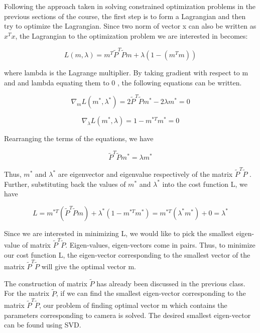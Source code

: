\documentclass[twoside]{article}
\begin{document}
Following the approach taken in solving constrained optimization problems in the previous sections of the course, the first step is to form a Lagrangian and then try to optimize the Lagrangian. Since two norm of vector x can also be written as $x^T x$, the Lagrangian to the optimization problem we are interested in becomes:

\begin{equation} \label{eqno:4}
 L(m,\lambda) = m^T \tilde{P}^T \tilde{P}m + \lambda (1-(m^T m))
\end{equation}

where lambda is the Lagrange multiplier. By taking gradient with respect to m and and lambda equating them to 0 , the following equations can be written.


\begin{equation} \label{eqno:5}
\nabla_m{L(m^*,\lambda^*)} = 2 \tilde{P}^T \tilde{P} m^* - 2 \lambda m^* = 0
\end{equation}

\begin{equation} \label{eqno:6}
\nabla_\lambda{L(m^*,\lambda)} = 1-  m^{*T} m^* = 0
\end{equation}


Rearranging the terms of the equations, we have 

\begin{equation} \label{eqno:7}
\tilde{P}^T \tilde{P} m^* =  \lambda m^*  \end{equation}

Thus, $m^*$ and $\lambda^* $ are eigenvector and eigenvalue respectively of the matrix $ \tilde{P}^T \tilde{P}$ . Further, substituting back the values of  $m^*$ and $\lambda^* $ into the cost function L, we have 

\begin{equation} \label{eqno:8}
L = m^{*T}(\tilde{P}^T \tilde{P} m)+ \lambda^* (1-m^{*T} m^*) = m^{*T}(\lambda^* m^*) + 0 = \lambda^*
\end{equation}

Since we are interested in minimizing L, we would like to pick the smallest eigen-value of matrix $\tilde{P}^T \tilde{P}$. Eigen-values, eigen-vectors come in pairs. Thus, to minimize our cost function L, the eigen-vector corresponding to the smallest vector of the matrix $\tilde{P}^T \tilde{P}$ will give the optimal vector m. 

The construction of matrix $\tilde{P}$ has already been discussed in the previous class. For the matrix $\tilde{P}$, if we can find the smallest eigen-vector corresponding to the matrix $\tilde{P}^T \tilde{P}$, our problem of finding optimal vector m which contains the parameters corresponding to camera is solved. The desired smallest eigen-vector can be found using SVD.
\end{document}
